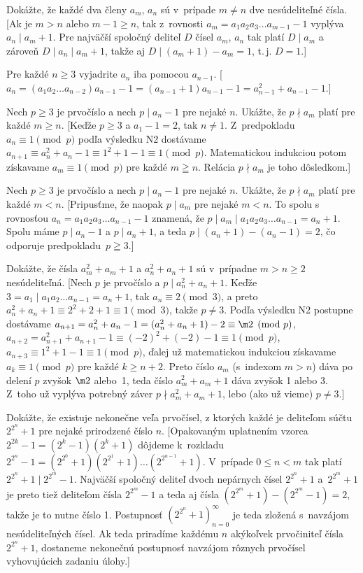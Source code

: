 {Dokážte, že každé dva členy $a_m$, $a_n$ sú v~prípade $m\ne n$
dve nesúdeliteľné čísla.
[Ak je $m>n$ alebo $m-1\geq n$, tak z~rovnosti
$a_m=a_1a_2a_3\dots a_{m-1}-1$
vyplýva $a_n \mid a_m+1$. Pre najväčší spoločný deliteľ $D$
čísel $a_m$, $a_n$ tak platí $D\mid a_m$ a zároveň
$D\mid a_n \mid a_m+1$, takže aj $D\mid (a_m+1)-a_m=1$, t.\,j.
$D=1$.]

Pre každé $n \geq 3$ vyjadrite $a_n$ iba pomocou $a_{n-1}$.
[$a_n = (a_1 a_2 \dots a_{n-2}) a_{n-1} - 1 = (a_{n-1}
+ 1)a_{n-1} - 1 = a_{n-1}^2 + a_{n-1} - 1.$]


Nech $p\geq3$ je prvočíslo a nech $p\mid a_n - 1$ pre nejaké
$n$. Ukážte, že $p\nmid a_m$ platí pre každé $m\geq n$.
[Keďže $p\geq3$ a $a_1-1=2$, tak $n\ne1$. Z~predpokladu
$a_n\equiv 1 \pmod p$ podľa výsledku N2 dostávame
$a_{n+1} \equiv a_n^2 + a_n - 1 \equiv 1^2+1-1 \equiv 1 \pmod
p$. Matematickou indukciou potom získavame $a_m \equiv 1 \pmod
p$ pre každé $m\geqq n$. Relácia $p \nmid a_m$ je toho dôsledkom.]

Nech $p\geq3$ je prvočíslo a nech $p\mid a_n - 1$ pre nejaké $n$.
Ukážte, že $p\nmid a_m$ platí pre každé $m<n$.
[Pripusťme, že naopak $p \mid a_m$ pre nejaké $m<n$. To spolu s rovnosťou
$a_n=a_1a_2a_3\dots a_{n-1}-1$ znamená, že
$p \mid a_m\mid a_1a_2a_3\dots a_{n-1}=a_n+1$. Spolu máme
$p\mid a_n - 1$ a $p\mid a_n+1$, a teda $p\mid(a_n+1)-(a_n -
1)=2$, čo odporuje predpokladu~$p\geqq3$.]

\D
Dokážte, že čísla $a_m^2 + a_m + 1$ a $a_n^2 + a_n + 1$ sú
v~prípadne $m>n\geq2$ nesúdeliteľná.
[Nech $p$ je prvočíslo a $p \mid a_n^2 + a_n + 1$. Keďže
$3=a_1 \mid a_1a_2\dots a_{n-1}=a_n+1$, tak
$a_n \equiv 2 \pmod 3$, a preto $a_n^2+a_n+1 \equiv
2^2+2+1 \equiv {1}\pmod 3$, takže $p\ne3$. Podľa výsledku N2
postupne dostávame
$a_{n+1}=a_n^2 + a_n - 1=(a_n^2+a_n+1)-2 \equiv \m2 \pmod p$,
$a_{n+2}=a_{n+1}^2 + a_{n+1} - 1 \equiv (-2)^2 + (-2) - 1
\equiv 1 \pmod p$,
$a_{n+3} \equiv 1^2+1-1 \equiv 1 \pmod p$, ďalej už matematickou
indukciou získavame $a_{k} \equiv 1 \pmod p$ pre každé
$k \geq n+2$. Preto číslo $a_m$ (s~indexom $m>n$)
dáva po delení $p$ zvyšok $\m2$ alebo~1,
teda číslo $a_m^2+a_m+1$ dáva zvyšok 1 alebo 3. Z~toho už vyplýva
potrebný záver $p \nmid a_m^2+a_m+1$, lebo (ako už vieme)
$p \ne 3$.]

Dokážte, že existuje nekonečne veľa prvočísel, z ktorých každé
je deliteľom súčtu $2^{2^n} + 1$ pre nejaké prirodzené číslo $n$.
[Opakovaným uplatnením vzorca $2^{2k}-1=(2^k-1)(2^k+1)$ dôjdeme
k~rozkladu $2^{2^n}-1 =
(2^{2^0}+1)(2^{2^1}+1)\dots(2^{2^{n-1}}+1)$. V~prípade $0\leq n<m$
tak platí $2^{2^n}+1 \mid 2^{2^m}-1$. Najväčší spoločný deliteľ
dvoch nepárnych čísel $2^{2^n}+1$ a~$2^{2^m}+1$ je preto tiež deliteľom
čísla $2^{2^m}-1$ a teda aj čísla $\left(2^{2^m}+1\right)-
\left(2^{2^m}-1\right)=2$, takže je to nutne číslo 1. Postupnosť
$\left(2^{2^n}+1\right)_{n=0}^\infty$ je teda zložená
s~navzájom nesúdeliteľných čísel. Ak teda priradíme každému $n$
akýkoľvek prvočiniteľ čísla $2^{2^n}+1$, dostaneme nekonečnú
postupnosť navzájom rôznych prvočísel vyhovujúcich zadaniu úlohy.]

}
